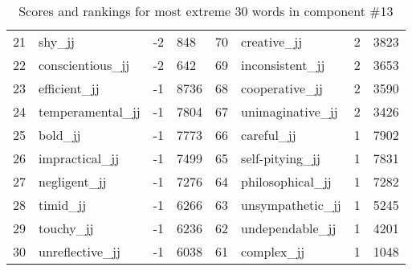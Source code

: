 \begin{table}[tbp]
\begin{tabular}{| rlr@{.}l | rlr@{.}l |}
    21 & shy\_jj & -2 & 848    &    70 & creative\_jj & 2 & 3823 \\
    22 & conscientious\_jj & -2 & 642    &    69 & inconsistent\_jj & 2 & 3653 \\
    23 & efficient\_jj & -1 & 8736    &    68 & cooperative\_jj & 2 & 3590 \\
    24 & temperamental\_jj & -1 & 7804    &    67 & unimaginative\_jj & 2 & 3426 \\
    25 & bold\_jj & -1 & 7773    &    66 & careful\_jj & 1 & 7902 \\
    26 & impractical\_jj & -1 & 7499    &    65 & self-pitying\_jj & 1 & 7831 \\
    27 & negligent\_jj & -1 & 7276    &    64 & philosophical\_jj & 1 & 7282 \\
    28 & timid\_jj & -1 & 6266    &    63 & unsympathetic\_jj & 1 & 5245 \\
    29 & touchy\_jj & -1 & 6236    &    62 & undependable\_jj & 1 & 4201 \\
    30 & unreflective\_jj & -1 & 6038    &    61 & complex\_jj & 1 & 1048 \\
    \hline
    \end{tabular}
    \caption{Scores and rankings for most extreme 30 words in component \#13} 
\end{table}
\clearpage
